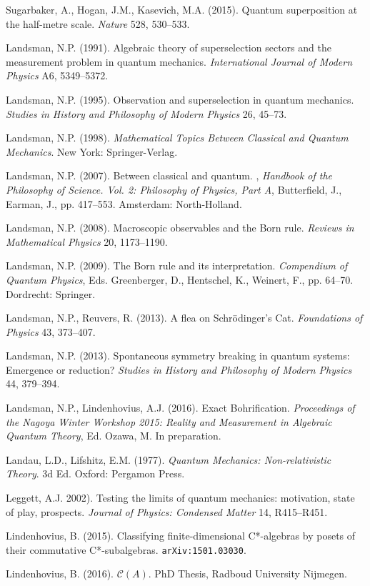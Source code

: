 \documentclass[12pt]{article}
\begin{document}
\begin{footnotesize}
\begin{trivlist}
Sugarbaker, A.,  Hogan, J.M.,  Kasevich, M.A. (2015). Quantum superposition at the half-metre scale.
\emph{Nature} 528, 530--533. 
\item Landsman, N.P. (1991). Algebraic
theory of superselection sectors and the measurement problem in
quantum mechanics. \emph{International Journal of Modern Physics}
A6, 5349--5372. 
\item Landsman, N.P. (1995).  Observation and superselection in quantum mechanics.
\emph{Studies in History and Philosophy of Modern Physics}  26, 45--73.
\item Landsman, N.P. (1998). \emph{Mathematical Topics Between Classical and Quantum Mechanics}. New York: Springer-Verlag. 
\item Landsman, N.P. (2007).
 Between classical and quantum. , \emph{Handbook of
the Philosophy of Science. Vol. 2: Philosophy of Physics, Part A}, Butterfield, J., Earman, J., pp. 417--553.
Amsterdam: North-Holland. 
 \item Landsman, N.P. (2008).
  Macroscopic observables and the Born rule. \emph{Reviews in Mathematical Physics} 20, 1173--1190.
 \item Landsman, N.P. (2009). The Born rule and its interpretation.
  \emph{Compendium of Quantum Physics}, Eds. Greenberger, D., Hentschel, K., Weinert, F., pp. 64--70. Dordrecht: Springer.
 \item   Landsman, N.P., Reuvers, R. (2013).  A flea on Schr\"{o}dinger's Cat. \emph{Foundations of Physics} 43, 373--407.
 \item   Landsman, N.P. (2013).  Spontaneous symmetry breaking in quantum systems: Emergence or reduction?
\emph{Studies in History and Philosophy of Modern Physics} 44, 379--394.  
\item  Landsman, N.P., Lindenhovius, A.J. (2016). Exact Bohrification. \emph{Proceedings of the Nagoya Winter Workshop 2015: Reality and Measurement in Algebraic Quantum Theory}, Ed. Ozawa, M.  In preparation.
\item Landau, L.D.,  Lifshitz, E.M. (1977). \emph{Quantum Mechanics: Non-relativistic Theory}.
3d Ed. Oxford: Pergamon Press.
\item Leggett, A.J. 2002). Testing the limits of quantum mechanics: motivation, state of play,
prospects. \emph{Journal of Physics: Condensed Matter} 14, R415--R451. 
\item Lindenhovius, B. (2015). Classifying finite-dimensional C*-algebras by posets of their commutative C*-subalgebras.
\texttt{arXiv:1501.03030}.
\item Lindenhovius, B. (2016). $\mathcal{C}(A)$.  PhD Thesis, Radboud University Nijmegen.

\end{trivlist}
\end{footnotesize}
\end{document}
